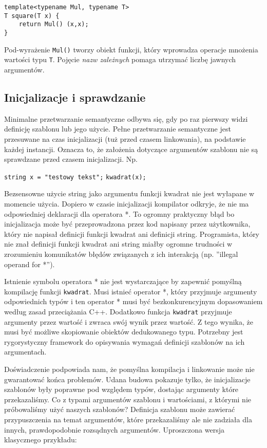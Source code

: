\documentclass[11pt, a4paper]{article}
\begin{document}
\begin{lstlisting}[frame=single]
template<typename Mul, typename T>
T square(T x) {
	return Mul() (x,x);
}
\end{lstlisting}

Pod-wyrażenie \verb#Mul()# tworzy obiekt funkcji, który wprowadza operacje mnożenia wartości typu \verb#T#. Pojęcie \emph{nazw zależnych} pomaga utrzymać liczbę jawnych argumentów.

\subsection{Inicjalizacje i sprawdzanie}

Minimalne przetwarzanie semantyczne odbywa się, gdy po raz pierwszy widzi definicję szablonu lub jego użycie. Pełne przetwarzanie semantyczne jest przesuwane na czas inicjalizacji (tuż przed czasem linkowania), na podstawie każdej instancji. Oznacza to, że założenia dotyczące argumentów szablonu nie są sprawdzane przed czasem inicjalizacji. Np.

\noindent \verb#string x = "testowy tekst";# \newline
\verb#kwadrat(x);#

Bezsensowne użycie string jako argumentu funkcji kwadrat nie jest wyłapane w momencie użycia. Dopiero w czasie inicjalizacji kompilator odkryje, że nie ma odpowiedniej deklaracji dla operatora *. To ogromny praktyczny błąd bo inicjalizacja może być przeprowadzona przez kod napisany przez użytkownika, który nie napisał definicji funkcji kwadrat ani definicji string. Programista, który nie znał definicji funkcji kwadrat ani string miałby ogromne trudności w zrozumieniu komunikatów błędów związanych z ich interakcją (np. ”illegal operand for *”).

Istnienie symbolu operatora * nie jest wystarczające by zapewnić pomyślną kompilację funkcji \verb#kwadrat#. Musi istnieć operator *, który przyjmuje argumenty odpowiednich typów i ten operator * musi być bezkonkurencyjnym dopasowaniem według zasad przeciążania C++. Dodatkowo funkcja \verb#kwadrat# przyjmuje argumenty przez wartość i zwraca swój wynik przez wartość. Z tego wynika, że musi być możliwe skopiowanie obiektów dedukowanego typu. Potrzebny jest rygorystyczny framework do opisywania wymagań definicji szablonów na ich argumentach.

Doświadczenie podpowiada nam, że pomyślna kompilacja i linkowanie może nie gwarantować końca problemów. Udana budowa pokazuje tylko, że inicjalizacje szablonów były poprawne pod względem typów, dostając argumenty które przekazaliśmy. Co z typami argumentów szablonu i wartościami, z którymi nie próbowaliśmy użyć naszych szablonów? Definicja szablonu może zawierać przypuszczenia na temat argumentów, które przekazaliśmy ale nie zadziała dla innych, prawdopodobnie rozsądnych argumentów. Uproszczona wersja klasycznego przykładu:
\end{document}
